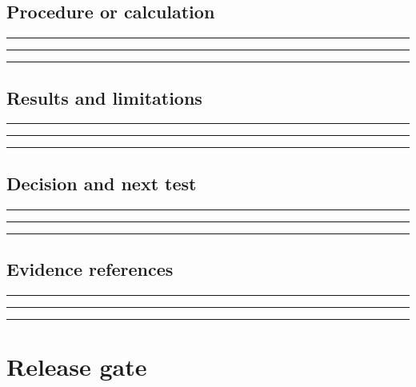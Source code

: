 \documentclass[11pt]{article}
\begin{document}
\subsection{Procedure or calculation}
\noindent\rule{\linewidth}{0.35pt}\par\vspace{0.22in}
\noindent\rule{\linewidth}{0.35pt}\par\vspace{0.22in}
\noindent\rule{\linewidth}{0.35pt}\par\vspace{0.18in}

\subsection{Results and limitations}
\noindent\rule{\linewidth}{0.35pt}\par\vspace{0.22in}
\noindent\rule{\linewidth}{0.35pt}\par\vspace{0.22in}
\noindent\rule{\linewidth}{0.35pt}\par\vspace{0.18in}

\subsection{Decision and next test}
\noindent\rule{\linewidth}{0.35pt}\par\vspace{0.22in}
\noindent\rule{\linewidth}{0.35pt}\par\vspace{0.22in}
\noindent\rule{\linewidth}{0.35pt}\par\vspace{0.18in}

\subsection{Evidence references}
\noindent\rule{\linewidth}{0.35pt}\par\vspace{0.22in}
\noindent\rule{\linewidth}{0.35pt}\par\vspace{0.22in}
\noindent\rule{\linewidth}{0.35pt}\par\vspace{0.18in}
\clearpage

\section{Release gate}
\end{document}
